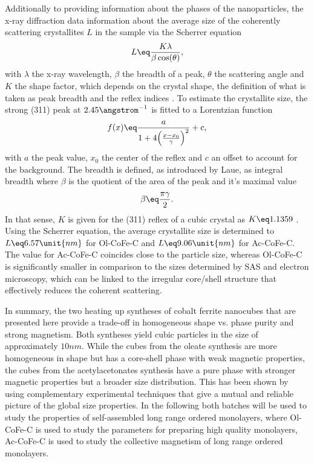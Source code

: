 \documentclass[\main/dresen_thesis.tex]{subfiles}
\begin{document}
    Additionally to providing information about the phases of the nanoparticles, the x-ray diffraction data information about the average size of the coherently scattering crystallites $L$ in the sample via the Scherrer equation
    \begin{equation}
      L \eq \frac{K \lambda}{\beta \cos(\theta)},
    \end{equation}
    with $\lambda$ the x-ray wavelength, $\beta$ the breadth of a peak, $\theta$ the scattering angle and $K$ the shape factor, which depends on the crystal shape, the definition of what is taken as peak breadth and the reflex indices \cite{Langford_1978_Scher}.
    To estimate the crystallite size, the strong (311) peak at $2.45 \angstrom^{-1}$ is fitted to a Lorentzian function
    \begin{align}
      f(x) \eq \frac{a}{1 + 4 \Bigl(\frac{x-x_0}{\gamma}\Bigr)^2} + c,
    \end{align}
    with $a$ the peak value, $x_0$ the center of the reflex and $c$ an offset to account for the background.
    The breadth is defined, as introduced by Laue, as integral breadth where $\beta$ is the quotient of the area of the peak and it's maximal value
    \begin{align}
      \beta \eq \frac{\pi \gamma}{2}.
    \end{align}
    In that sense, $K$ is given for the (311) reflex of a cubic crystal as $K \eq 1.1359$ \cite{Langford_1978_Scher}.
    Using the Scherrer equation, the average crystallite size is determined to $L \eq 6.57 \unit{nm}$ for Ol-CoFe-C and $L \eq 9.06\unit{nm}$ for Ac-CoFe-C.
    The value for Ac-CoFe-C coincides close to the particle size, whereas Ol-CoFe-C is significantly smaller in comparison to the sizes determined by SAS and electron microscopy, which can be linked to the irregular core/shell structure that effectively reduces the coherent scattering.

    In summary, the two heating up syntheses of cobalt ferrite nanocubes that are presented here provide a trade-off in homogeneous shape vs. phase purity and strong magnetism.
    Both syntheses yield cubic particles in the size of approximately $10 \unit{nm}$.
    While the cubes from the oleate synthesis are more homogeneous in shape but has a core-shell phase with weak magnetic properties, the cubes from the acetylacetonates synthesis have a pure phase with stronger magnetic properties but a broader size distribution.
    This has been shown by using complementary experimental techniques that give a mutual and reliable picture of the global size properties.
    In the following both batches will be used to study the properties of self-assembled long range ordered monolayers, where Ol-CoFe-C is used to study the parameters for preparing high quality monolayers, Ac-CoFe-C is used to study the collective magnetism of long range ordered monolayers.
\end{document}
